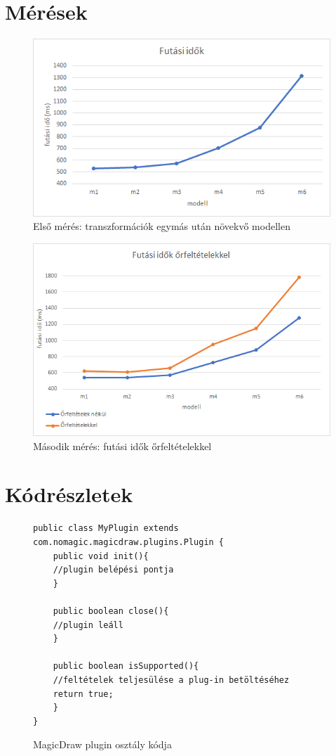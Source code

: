 \clearpage\section{Mérések}

\begin{figure}[H]
	\centering
	\includegraphics[keepaspectratio, width=140mm]{figures/meres1.png}
	\caption{Első mérés: transzformációk egymás után növekvő modellen}
\end{figure}

\begin{figure}[H]
	\centering
	\includegraphics[keepaspectratio, width=140mm]{figures/meres2.png}
	\caption{Második mérés: futási idők őrfeltételekkel}
\end{figure}

\clearpage \section{Kódrészletek}
\begin{figure}[!ht]
	\lstset{style=javacode}
	\begin{lstlisting}
public class MyPlugin extends com.nomagic.magicdraw.plugins.Plugin {
	public void init(){
	//plugin belépési pontja
	}
	
	public boolean close(){
	//plugin leáll
	}
	
	public boolean isSupported(){
	//feltételek teljesülése a plug-in betöltéséhez
	return true;
	}
}
	\end{lstlisting}
	\caption{MagicDraw plugin osztály kódja}
\end{figure}

